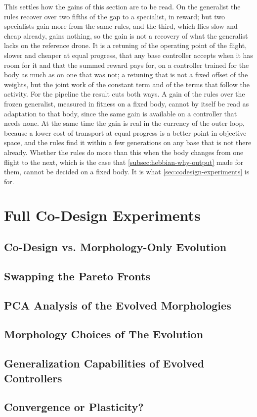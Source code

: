 This settles how the gains of this section are to be read. On the generalist the rules recover over two fifths of the gap to a specialist, in reward; but two specialists gain more from the same rules, and the third, which flies slow and cheap already, gains nothing, so the gain is not a recovery of what the generalist lacks on the reference drone. It is a retuning of the operating point of the flight, slower and cheaper at equal progress, that any base controller accepts when it has room for it and that the summed reward pays for, on a controller trained for the body as much as on one that was not; a retuning that is not a fixed offset of the weights, but the joint work of the constant term and of the terms that follow the activity. For the pipeline the result cuts both ways. A gain of the rules over the frozen generalist, measured in fitness on a fixed body, cannot by itself be read as adaptation to that body, since the same gain is available on a controller that needs none. At the same time the gain is real in the currency of the outer loop, because a lower cost of transport at equal progress is a better point in objective space, and the rules find it within a few generations on any base that is not there already. Whether the rules do more than this when the body changes from one flight to the next, which is the case that \autoref{subsec:hebbian-why-output} made for them, cannot be decided on a fixed body. It is what \autoref{sec:codesign-experiments} is for.

\section{Full Co-Design Experiments}
\label{sec:codesign-experiments}
\subsection{Co-Design vs. Morphology-Only Evolution}
\subsection{Swapping the Pareto Fronts}
\subsection{PCA Analysis of the Evolved Morphologies}
\subsection{Morphology Choices of The Evolution}
\subsection{Generalization Capabilities of Evolved Controllers}
\subsection{Convergence or Plasticity?}

